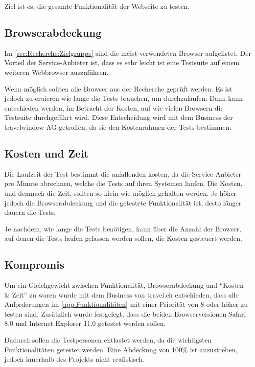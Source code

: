 Ziel ist es, die gesamte Funktionalität der Webseite zu testen.

\subsection{Browserabdeckung}
Im \cref{sec:Recherche:Zielgruppe}  sind die meist verwendeten Browser aufgelistet. Der Vorteil der Service-Anbieter ist, dass es sehr leicht ist eine Testsuite auf einem weiteren Webbrowser auszuführen. 

Wenn möglich sollten alle Browser aus der Recherche geprüft werden. Es ist jedoch zu eruieren wie lange die Tests brauchen, um durchzulaufen. Dann kann entschieden werden, im Betracht der Kosten, auf wie vielen Browsern die Testsuite durchgeführt wird. Diese Entscheidung wird mit dem Business der travelwindow AG getroffen, da sie den Kostenrahmen der Tests bestimmen.

\subsection{Kosten und Zeit}
Die Laufzeit der Test bestimmt die anfallenden kosten, da die Service-Anbieter pro Minute abrechnen, welche die Tests auf ihren Systemen laufen. Die Kosten, und demnach die Zeit, sollten so klein wie möglich gehalten werden. Je höher jedoch die Browserabdeckung und die getestete Funktionalität ist, desto länger dauern die Tests.

Je nachdem, wie lange die Tests benötigen, kann über die Anzahl der Browser, auf denen die Tests laufen gelassen werden sollen, die Kosten gesteuert werden.

\subsection{Kompromis}
\label{sec:analyse:testabdeckung}
Um ein Gleichgewicht zwischen Funktionalität, Browserabdeckung und "`Kosten \& Zeit"' zu waren wurde mit dem Business von travel.ch entschieden, dass alle Anforderungen im \cref{app:Funktionalitäten}  mit einer Priorität von 8 oder höher zu testen sind. Zusätzlich wurde festgelegt, dass die beiden Browserversionen Safari 8.0 und Internet Explorer 11.0 getestet werden sollen.

Dadurch sollen die Testpersonen entlastet werden, da die wichtigsten Funktionalitäten getestet werden. Eine Abdeckung von 100\% ist anzustreben, jedoch innerhalb des Projekts nicht realistisch.

